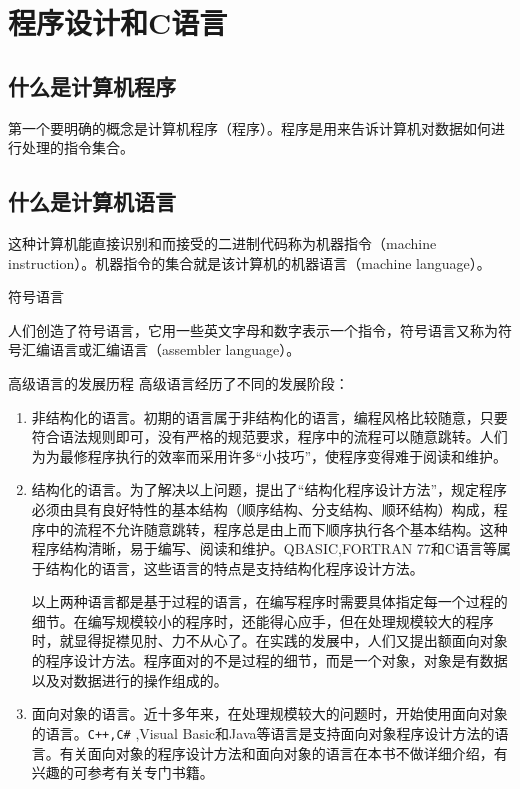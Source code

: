 \chapter{程序设计和C语言}

\section{什么是计算机程序}

第一个要明确的概念是计算机程序（程序）。程序是用来告诉计算机对数据如何进行处理的指令集合。

\section{什么是计算机语言}

这种计算机能直接识别和而接受的二进制代码称为机器指令（machine instruction）。机器指令的集合就是该计算机的机器语言（machine language）。

符号语言

人们创造了符号语言，它用一些英文字母和数字表示一个指令，符号语言又称为符号汇编语言或汇编语言（assembler language）。

高级语言的发展历程
高级语言经历了不同的发展阶段：
\begin{enumerate}
	\item 非结构化的语言。初期的语言属于非结构化的语言，编程风格比较随意，只要符合语法规则即可，没有严格的规范要求，程序中的流程可以随意跳转。人们为为最修程序执行的效率而采用许多“小技巧”，使程序变得难于阅读和维护。
	\item 结构化的语言。为了解决以上问题，提出了“结构化程序设计方法”，规定程序必须由具有良好特性的基本结构（顺序结构、分支结构、顺环结构）构成，程序中的流程不允许随意跳转，程序总是由上而下顺序执行各个基本结构。这种程序结构清晰，易于编写、阅读和维护。QBASIC,FORTRAN 77和C语言等属于结构化的语言，这些语言的特点是支持结构化程序设计方法。

以上两种语言都是基于过程的语言，在编写程序时需要具体指定每一个过程的细节。在编写规模较小的程序时，还能得心应手，但在处理规模较大的程序时，就显得捉襟见肘、力不从心了。在实践的发展中，人们又提出额面向对象的程序设计方法。程序面对的不是过程的细节，而是一个对象，对象是有数据以及对数据进行的操作组成的。
	\item 面向对象的语言。近十多年来，在处理规模较大的问题时，开始使用面向对象的语言。\verb|C++,C#| ,Visual Basic和Java等语言是支持面向对象程序设计方法的语言。有关面向对象的程序设计方法和面向对象的语言在本书不做详细介绍，有兴趣的可参考有关专门书籍。
\end{enumerate}

